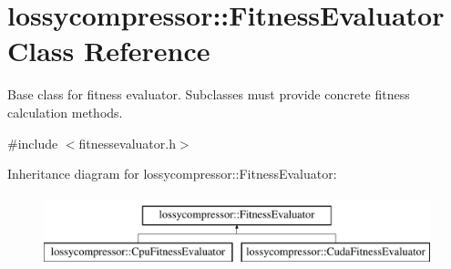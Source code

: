 \hypertarget{classlossycompressor_1_1_fitness_evaluator}{}\section{lossycompressor\+:\+:Fitness\+Evaluator Class Reference}
\label{classlossycompressor_1_1_fitness_evaluator}


Base class for fitness evaluator. Subclasses must provide concrete fitness calculation methods.  




{\ttfamily \#include $<$fitnessevaluator.\+h$>$}

Inheritance diagram for lossycompressor\+:\+:Fitness\+Evaluator\+:\begin{figure}[H]
\begin{center}
\leavevmode
\includegraphics[height=2.000000cm]{classlossycompressor_1_1_fitness_evaluator}
\end{center}
\end{figure}
